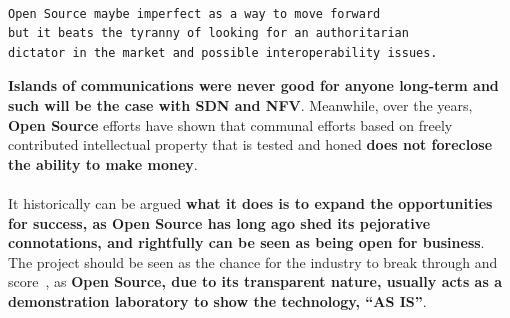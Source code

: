 \documentclass[a4paper, 12pt]{book}
\begin{document}
\begin{verbatim}

Open Source maybe imperfect as a way to move forward
but it beats the tyranny of looking for an authoritarian
dictator in the market and possible interoperability issues.

\end{verbatim}
\textbf{Islands of communications were never good for anyone long-term and such will be the case with SDN and NFV}. Meanwhile, over the years, \textbf{Open Source} efforts have shown that communal efforts based on freely contributed intellectual property that is tested and honed \textbf{does not foreclose the ability to make money}.\\
\\
It historically can be argued \textbf{what it does is to expand the opportunities for success, as Open Source has long ago shed its pejorative connotations, and rightfully can be seen as being open for business}. The project should be seen as the chance for the industry to break through and score~\cite{NFVZoneOpenDaylight}, as \textbf{Open Source, due to its transparent nature, usually acts as a demonstration laboratory to show the technology, ``AS IS''}.
\end{document}
